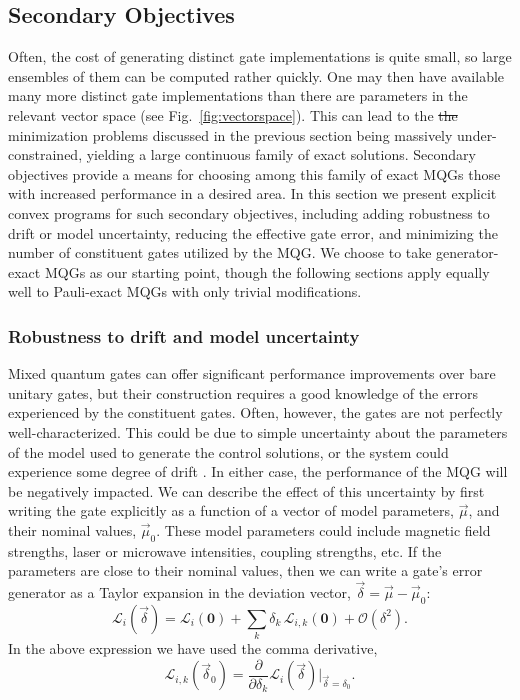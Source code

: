\documentclass[aps,nofootinbib,pra,notitlepage,twocolumn]{revtex4-1}
\newcommand{\order}[1]{\mathcal{O}\left( #1 \right)}
\newcommand{\genmat}{\ensuremath{{\mathcal{L}}}}
\newcommand{\0}{\ensuremath{\mathbf{0}}}
\providecommand{\DIFdeltex}[1]{{\protect\color{red}\sout{#1}}}                      %
\providecommand{\DIFdelbegin}{} %
\providecommand{\DIFdelend}{} %
\providecommand{\DIFdel}[1]{\texorpdfstring{\DIFdeltex{#1}}{}} %
\newcommand{\DIFscaledelfig}{0.5}
\newlength{\DIFdelgraphicswidth} %
\newlength{\DIFdelgraphicsheight} %
\newcommand{\DIFdelincludegraphics}[2][]{%
\sbox{\DIFdelgraphicsbox}{\DIFOincludegraphics[#1]{#2}}%
\settoboxwidth{\DIFdelgraphicswidth}{\DIFdelgraphicsbox} %
\settoboxtotalheight{\DIFdelgraphicsheight}{\DIFdelgraphicsbox} %
\scalebox{\DIFscaledelfig}{%
\parbox[b]{\DIFdelgraphicswidth}{\usebox{\DIFdelgraphicsbox}\\[-\baselineskip] \rule{\DIFdelgraphicswidth}{0em}}\llap{\resizebox{\DIFdelgraphicswidth}{\DIFdelgraphicsheight}{%
\setlength{\unitlength}{\DIFdelgraphicswidth}%
\begin{picture}(1,1)%
\thicklines\linethickness{2pt} %
{\color[rgb]{1,0,0}\put(0,0){\framebox(1,1){}}}%
{\color[rgb]{1,0,0}\put(0,0){\line( 1,1){1}}}%
{\color[rgb]{1,0,0}\put(0,1){\line(1,-1){1}}}%
\end{picture}%
}\hspace*{3pt}}} %
} %
\DeclareRobustCommand{\DIFdelbegin}{\DIFOdelbegin \let\includegraphics\DIFdelincludegraphics} %
\DeclareRobustCommand{\DIFdelend}{\DIFOaddend \let\includegraphics\DIFOincludegraphics} %
\begin{document}

\subsection{Secondary Objectives}
\noindent 
Often, the cost of generating distinct gate implementations is quite small, so large ensembles of them can be computed rather quickly. One may then have available many more distinct gate implementations than there are parameters in the relevant vector space (see Fig.~\ref{fig:vectorspace}). This can lead to the \DIFdelbegin \DIFdel{the }\DIFdelend minimization problems discussed in the previous section being massively under-constrained, yielding a large continuous family of exact solutions. Secondary objectives provide a means for choosing among this family of exact MQGs those with increased performance in a desired area. In this section we present explicit convex programs for such secondary objectives, including adding robustness to drift or model uncertainty, reducing the effective gate error, and minimizing the number of constituent gates utilized by the MQG. We choose to take generator-exact MQGs as our starting point, though the following sections apply equally well to Pauli-exact MQGs with only trivial modifications. 

\subsubsection{Robustness to drift and model uncertainty} %
\label{sub:adding_robustness}
\noindent 
Mixed quantum gates can offer significant performance improvements over bare unitary gates, but their construction requires a good knowledge of the errors experienced by the constituent gates. Often, however, the gates are not perfectly well-characterized. This could be due to simple uncertainty about the parameters of the model used to generate the control solutions, or the system could experience some degree of drift \cite{1907.13608}. In either case, the performance of the MQG will be negatively impacted. We can describe the effect of this uncertainty by first writing the gate explicitly as a function of a vector of model parameters, $\vec\mu$, and their nominal values, $\vec\mu_0$. These model parameters could include magnetic field strengths, laser or microwave intensities, coupling strengths, etc. If the parameters are close to their nominal values, then we can write a gate's error generator as a Taylor expansion in the deviation vector, $\vec\delta = \vec\mu-\vec\mu_0$:
\begin{equation}
	\label{eq:sensitivity_expansion}
	\genmat_i(\vec \delta) = \genmat_i(\0) + \sum_k \delta_k \,\genmat_{i,k}(\0) + \order{\delta^2}.
\end{equation} 
In the above expression we have used the comma derivative, 
\begin{equation}
	\genmat_{i,k}(\vec \delta_0) = \frac{\partial}{\partial \delta_k} \genmat_i(\vec\delta) \vert_{\vec \delta=\delta_0}.
\end{equation}
\end{document}
